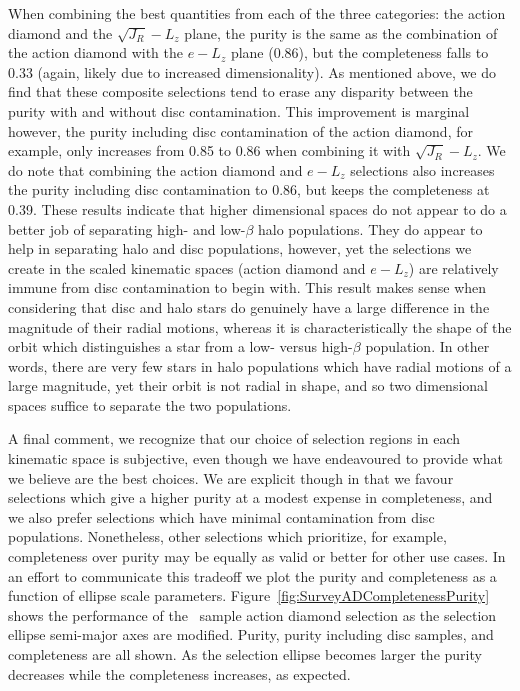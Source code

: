 When combining the best quantities from each of the three categories: the action diamond and the $\sqrt{J_{R}}-L_{z}$ plane, the purity is the same as the combination of the action diamond with the $e-L_{z}$ plane (0.86), but the completeness falls to 0.33 (again, likely due to increased dimensionality). As mentioned above, we do find that these composite selections tend to erase any disparity between the purity with and without disc contamination. This improvement is marginal however, the purity including disc contamination of the action diamond, for example, only increases from 0.85 to 0.86 when combining it with $\sqrt{J_{R}}-L_{z}$. We do note that combining the action diamond and $e-L_{z}$ selections also increases the purity including disc contamination to 0.86, but keeps the completeness at 0.39. These results indicate that higher dimensional spaces do not appear to do a better job of separating high- and low-$\beta$ halo populations. They do appear to help in separating halo and disc populations, however, yet the selections we create in the scaled kinematic spaces (action diamond and $e-L_{z}$) are relatively immune from disc contamination to begin with. This result makes sense when considering that disc and halo stars do genuinely have a large difference in the magnitude of their radial motions, whereas it is characteristically the shape of the orbit which distinguishes a star from a low- versus high-$\beta$ population. In other words, there are very few stars in halo populations which have radial motions of a large magnitude, yet their orbit is not radial in shape, and so two dimensional spaces suffice to separate the two populations. 

A final comment, we recognize that our choice of selection regions in each kinematic space is subjective, even though we have endeavoured to provide what we believe are the best choices. We are explicit though in that we favour selections which give a higher purity at a modest expense in completeness, and we also prefer selections which have minimal contamination from disc populations. Nonetheless, other selections which prioritize, for example, completeness over purity may be equally as valid or better for other use cases. In an effort to communicate this tradeoff we plot the purity and completeness as a function of ellipse scale parameters. Figure~\ref{fig:SurveyADCompletenessPurity} shows the performance of the \survey\ sample action diamond selection as the selection ellipse semi-major axes are modified. Purity, purity including disc samples, and completeness are all shown. As the selection ellipse becomes larger the purity decreases while the completeness increases, as expected.

